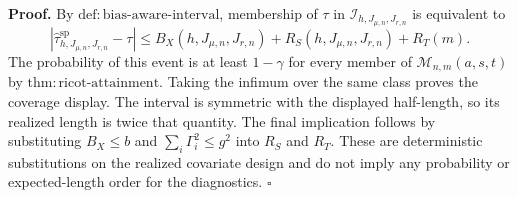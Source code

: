 \textbf{Proof.}
By \(\mathrm{def:bias\text{-}aware\text{-}interval}\), membership of \(\tau\) in \(\mathcal I_{h,J_{\mu,n},J_{r,n}}\) is equivalent to
\[
\left|\widehat\tau^{\mathrm{sp}}_{h,J_{\mu,n},J_{r,n}}-\tau\right|
\le B_X(h,J_{\mu,n},J_{r,n})+R_S(h,J_{\mu,n},J_{r,n})+R_T(m).
\]
The probability of this event is at least \(1-\gamma\) for every member of \(\mathcal M_{n,m}(a,s,t)\) by \(\mathrm{thm:ricot\text{-}attainment}\). Taking the infimum over the same class proves the coverage display. The interval is symmetric with the displayed half-length, so its realized length is twice that quantity. The final implication follows by substituting \(B_X\le b\) and \(\sum_i\Gamma_i^2\le g^2\) into \(R_S\) and \(R_T\). These are deterministic substitutions on the realized covariate design and do not imply any probability or expected-length order for the diagnostics. \(\square\)